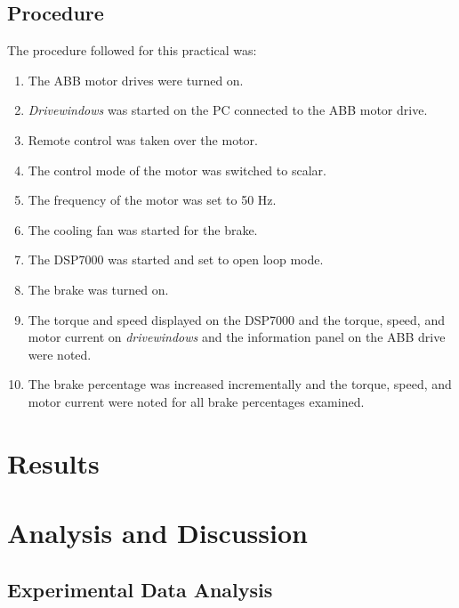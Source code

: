 \documentclass[12pt]{report}
\begin{document}
	\section{Procedure}
	The procedure followed for this practical was:
	\begin{enumerate}
		\item{The ABB motor drives were turned on.}
		\item{\textit{Drivewindows} was started on the PC connected to the ABB motor drive.}
		\item{Remote control was taken over the motor.}
		\item{The control mode of the motor was switched to scalar.}
		\item{The frequency of the motor was set to 50 Hz.}
		\item{The cooling fan was started for the brake.}
		\item{The DSP7000 was started and set to open loop mode.}
		\item{The brake was turned on.}
		\item{The torque and speed displayed on the DSP7000 and the torque, speed, and motor current on \textit{drivewindows} and the information panel on the ABB drive were noted.}
		\item{The brake percentage was increased incrementally and the torque, speed, and motor current were noted for all brake percentages examined.}
	\end{enumerate}
	
	\chapter{Results}
	
	\chapter{Analysis and Discussion}
	
		\section{Experimental Data Analysis}
\end{document}
